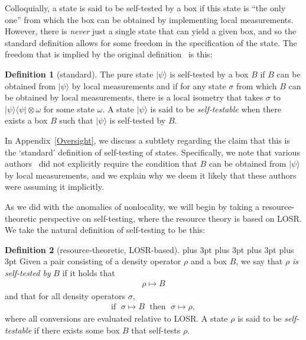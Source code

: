 \documentclass[prx,11pt,letterpaper,twocolumn,accepted=2023-11-27]{quantumarticle}
\theoremstyle{plain}
\theoremstyle{definition}
\newtheorem{defn}{Definition}
\begin{document}
Colloquially, a state is said to be self-tested by a box if this state is ``the only one'' from which the box can be obtained by implementing local measurements. However, there is {\em never} just a single state that can yield a given box, and so the standard definition allows for some freedom in the specification of the state.  The freedom that is implied by the original definition~\cite{mayers1998quantum,mayers2003self,Yang2013selftesting,Wang2016} is this:
\begin{defn}[standard]\label{defnselftesteOld}
The pure state $|\psi\rangle$ is self-tested by a  box $B$  if $B$ can be obtained from $|\psi\rangle$ by local measurements and if for any state $\sigma$ from which $B$ can be obtained by local measurements, there is a local isometry that takes $\sigma$ to $|\psi\rangle\langle \psi| \otimes \omega$ for some state $\omega$.
A state $|\psi\rangle$ is said to be {\em self-testable} when there exists a box $B$ such that $|\psi\rangle$ is self-tested by $B$.
 \end{defn}

In Appendix~\ref{Oversight}, we discuss a subtlety regarding the claim that this is the `standard' definition of self-testing of states. Specifically, we note that various authors~\cite{Coladangelo2017,vsupic2020self} did not explicitly require 
 the condition that $B$ can be obtained from $|\psi\rangle$ by local measurements, and we explain why we deem it likely that 
these authors were assuming it implicitly.

As we did with the anomalies of nonlocality, we will begin by taking a resource-theoretic perspective on self-testing, where the resource theory is based on LOSR.  We take the natural definition of self-testing to be this: 
\begin{defn}[resource-theoretic, LOSR-based]\label{defnselfteste}
{
\abovedisplayskip=1pt plus 3pt
\belowdisplayskip=1pt plus 3pt
\abovedisplayshortskip=1pt plus 3pt
\belowdisplayshortskip=1pt plus 3pt
Given a pair consisting of a density operator $\rho$ and a box $B$, we say that $\rho$  {\em is self-tested by} $B$ if it holds that
\begin{align}
\rho \mapsto B\nonumber
\end{align}
 and that for all density operators $\sigma$,
\begin{align} 
\textrm{if }\; \sigma \mapsto B\; \textrm{ then }\; \sigma \mapsto \rho,\nonumber
\end{align}
where all conversions are evaluated relative to LOSR. A state $\rho$ is said to be {\em self-testable} if there exists some box $B$ that self-tests $\rho$.
}\end{defn}
\end{document}
